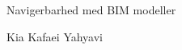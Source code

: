 \begin{titlepage}
\begin{center}
\noindent { \large \textbf{
}}


\vspace{5mm}

Navigerbarhed med BIM modeller

\noindent { \large \textbf{\today}}


\vspace{5mm}
Kia Kafaei Yahyavi

\end{center}

\vspace{29mm}


\end{titlepage}



